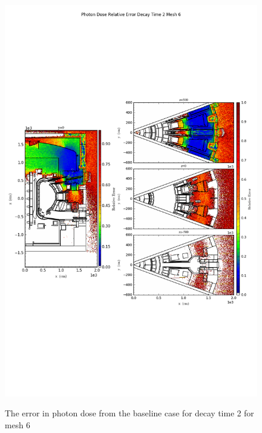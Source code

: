 \begin{figure}[ht!]
\centering
\includegraphics[trim={0cm 9cm 0cm 10cm},clip,scale=0.75]{../plots/final_model_nob4c/Photon_Dose_Relative_Error_Decay_Time_2_Mesh_6.png}
\label{fig:photons_dc2_no4bc_m6_error}
\caption{The error in photon dose from the baseline case for decay time 2 for mesh 6}
\end{figure}
